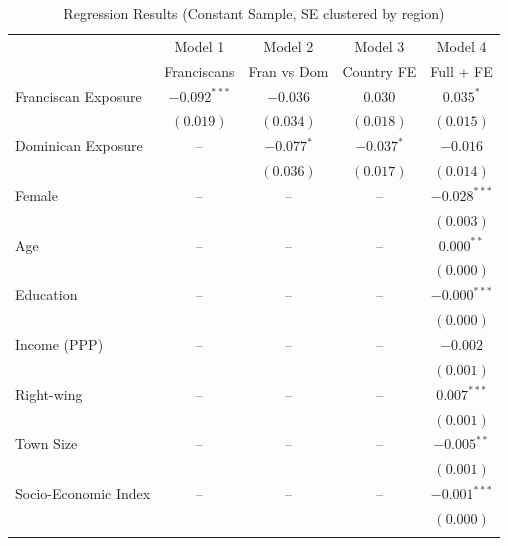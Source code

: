 \documentclass[12pt, a4paper]{article}
\begin{document}
\begin{table}[ht]
\centering
\caption{Regression Results (Constant Sample, SE clustered by region)}
\label{tab:reg_results_constant_sample}
\footnotesize
\renewcommand{\arraystretch}{0.9}
\setlength{\tabcolsep}{7pt}

\begin{tabular}{lcccc}
\toprule
 & Model 1 & Model 2 & Model 3 & Model 4 \\
 & Franciscans & Fran vs Dom & Country FE & Full + FE \\
\midrule

Franciscan Exposure 
& $-0.092^{***}$ 
& $-0.036$ 
& $0.030$ 
& $0.035^{*}$ \\
& $(0.019)$ & $(0.034)$ & $(0.018)$ & $(0.015)$ \\
\addlinespace[0.2em]

Dominican Exposure 
& -- 
& $-0.077^{*}$ 
& $-0.037^{*}$ 
& $-0.016$ \\
&  & $(0.036)$ & $(0.017)$ & $(0.014)$ \\

\midrule

Female 
& -- & -- & -- 
& $-0.028^{***}$ \\
&  &  &  & $(0.003)$ \\
\addlinespace[0.2em]

Age 
& -- & -- & -- 
& $0.000^{**}$ \\
&  &  &  & $(0.000)$ \\
\addlinespace[0.2em]

Education 
& -- & -- & -- 
& $-0.000^{***}$ \\
&  &  &  & $(0.000)$ \\
\addlinespace[0.2em]

Income (PPP) 
& -- & -- & -- 
& $-0.002$ \\
&  &  &  & $(0.001)$ \\
\addlinespace[0.2em]

Right-wing 
& -- & -- & -- 
& $0.007^{***}$ \\
&  &  &  & $(0.001)$ \\
\addlinespace[0.2em]

Town Size 
& -- & -- & -- 
& $-0.005^{**}$ \\
&  &  &  & $(0.001)$ \\
\addlinespace[0.2em]

Socio-Economic Index 
& -- & -- & -- 
& $-0.001^{***}$ \\
&  &  &  & $(0.000)$ \\
\addlinespace[0.2em]


\end{tabular}
\end{table}
\end{document}
